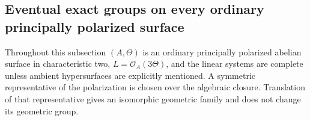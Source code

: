 \subsection{Eventual exact groups on every ordinary principally polarized surface}
\label{subsec:ordinary-ppav-surface-full-groups}

Throughout this subsection $(A,\Theta)$ is an ordinary principally polarized
abelian surface in characteristic two, $L=\mathcal O_A(3\Theta)$, and the
linear systems are complete unless ambient hypersurfaces are explicitly
mentioned. A symmetric representative of the polarization is chosen over the
algebraic closure. Translation of that representative gives an isomorphic
geometric family and does not change its geometric group.

